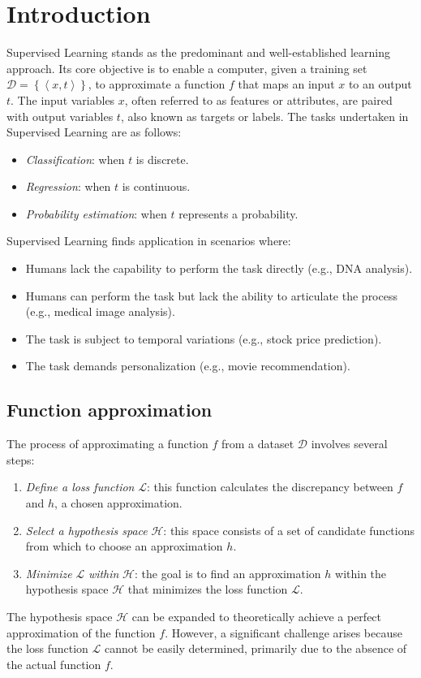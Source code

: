 \section{Introduction}

Supervised Learning stands as the predominant and well-established learning approach. 
Its core objective is to enable a computer, given a training set $\mathcal{D}=\left\{\left\langle x,t \right\rangle\right\}$, to approximate a function $f$ that maps an input $x$ to an output $t$.
The input variables $x$, often referred to as features or attributes, are paired with output variables $t$, also known as targets or labels. 
The tasks undertaken in Supervised Learning are as follows:
\begin{itemize}
    \item \textit{Classification}: when $t$ is discrete. 
    \item \textit{Regression}: when $t$ is continuous. 
    \item \textit{Probability estimation}: when $t$ represents a probability.
\end{itemize}
Supervised Learning finds application in scenarios where:
\begin{itemize}
    \item Humans lack the capability to perform the task directly (e.g., DNA analysis).
    \item Humans can perform the task but lack the ability to articulate the process (e.g., medical image analysis).
    \item The task is subject to temporal variations (e.g., stock price prediction).
    \item The task demands personalization (e.g., movie recommendation).
\end{itemize}

\subsection{Function approximation}
The process of approximating a function $f$ from a dataset $\mathcal{D}$ involves several steps:
\begin{enumerate}
    \item \textit{Define a loss function} $\mathcal{L}$: this function calculates the discrepancy between $f$ and $h$, a chosen approximation.
    \item \textit{Select a hypothesis space} $\mathcal{H}$: this space consists of a set of candidate functions from which to choose an approximation $h$. 
    \item \textit{Minimize} $\mathcal{L}$ \textit{within} $\mathcal{H}$: the goal is to find an approximation $h$ within the hypothesis space $\mathcal{H}$ that minimizes the loss function $\mathcal{L}$.
\end{enumerate}
The hypothesis space $\mathcal{H}$ can be expanded to theoretically achieve a perfect approximation of the function $f$. 
However, a significant challenge arises because the loss function $\mathcal{L}$ cannot be easily determined, primarily due to the absence of the actual function $f$.

